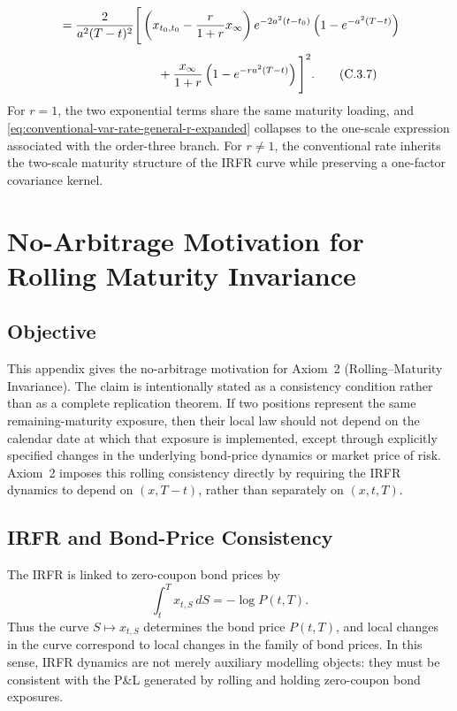 \documentclass[12pt]{article}
\theoremstyle{statementstyle}
\begin{document}
\begin{appendices}
\begin{align}
&=
\frac{2}{a^{2}(T-t)^{2}}
\Bigg[
\left(x_{t_{0},t_{0}}-\frac{r}{1+r}x_{\infty}\right)
e^{-2a^{2}(t-t_{0})}
\left(1-e^{-a^{2}(T-t)}\right)
\notag\\[0.4em]
&\qquad\qquad\qquad\qquad
+
\frac{x_{\infty}}{1+r}
\left(1-e^{-ra^{2}(T-t)}\right)
\Bigg]^{2}.
\tag{C.3.7}\label{eq:conventional-var-rate-general-r-expanded}
\end{align}
For $r=1$, the two exponential terms share the same maturity loading, and
\eqref{eq:conventional-var-rate-general-r-expanded} collapses to the
one-scale expression associated with the order-three branch. For
$r\neq 1$, the conventional rate inherits the two-scale maturity structure
of the IRFR curve while preserving a one-factor covariance kernel.



\section{No-Arbitrage Motivation for Rolling Maturity Invariance}
\label{appendix:D}

\subsection{Objective}
\label{D.1}

This appendix gives the no-arbitrage motivation for Axiom~2 (Rolling--Maturity
Invariance). The claim is intentionally stated as a consistency condition rather
than as a complete replication theorem. If two positions represent the same
remaining-maturity exposure, then their local law should not depend on the
calendar date at which that exposure is implemented, except through explicitly
specified changes in the underlying bond-price dynamics or market price of risk.
Axiom~2 imposes this rolling consistency directly by requiring the IRFR dynamics
to depend on \((x,T-t)\), rather than separately on \((x,t,T)\).

\subsection{IRFR and Bond-Price Consistency}
\label{D.2}

The IRFR is linked to zero-coupon bond prices by
\[
\int_t^T x_{t,S}\,dS=-\log P(t,T).
\]
Thus the curve \(S\mapsto x_{t,S}\) determines the bond price \(P(t,T)\), and
local changes in the curve correspond to local changes in the family of bond
prices. In this sense, IRFR dynamics are not merely auxiliary modelling objects:
they must be consistent with the P\&L generated by rolling and holding
zero-coupon bond exposures.


\end{appendices}
\end{document}

